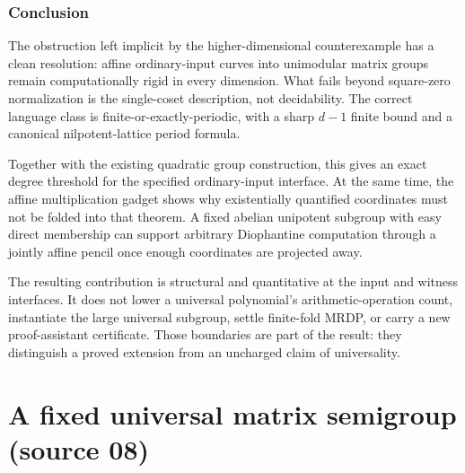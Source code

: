 \documentclass[11pt,letterpaper]{article}
\theoremstyle{definition}
\theoremstyle{remark}
\newcounter{umsaveeq}
\begin{document}
\section{Conclusion}
The obstruction left implicit by the higher-dimensional counterexample has a clean resolution: affine ordinary-input curves into unimodular matrix groups remain computationally rigid in every dimension. What fails beyond square-zero normalization is the single-coset description, not decidability. The correct language class is finite-or-exactly-periodic, with a sharp $d-1$ finite bound and a canonical nilpotent-lattice period formula.

Together with the existing quadratic group construction, this gives an exact degree threshold for the specified ordinary-input interface. At the same time, the affine multiplication gadget shows why existentially quantified coordinates must not be folded into that theorem. A fixed abelian unipotent subgroup with easy direct membership can support arbitrary Diophantine computation through a jointly affine pencil once enough coordinates are projected away.

The resulting contribution is structural and quantitative at the input and witness interfaces. It does not lower a universal polynomial's arithmetic-operation count, instantiate the large universal subgroup, settle finite-fold MRDP, or carry a new proof-assistant certificate. Those boundaries are part of the result: they distinguish a proved extension from an uncharged claim of universality.

\part{A fixed universal matrix semigroup (source 08)}\label{gts:part:um}
\setcounter{umsaveeq}{\value{equation}}\setcounter{equation}{0}%
\let\umoldtheequation\theequation\let\umoldtheHequation\theHequation
\renewcommand{\theequation}{V.\arabic{equation}}\renewcommand{\theHequation}{um.\arabic{equation}}%
\end{document}
